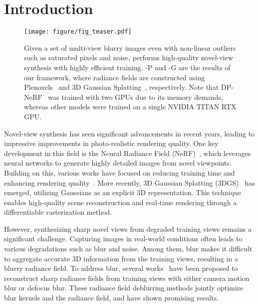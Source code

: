 \section{Introduction}
\label{sec:intro}

\begin{figure*}[t!]
\centering
    \texttt{[image: figure/fig\_teaser.pdf]}
    \caption{Given a set of multi-view blurry images even with non-linear outliers such as saturated pixels and noise, \MethodName{} performs high-quality novel-view synthesis with highly efficient training. \MethodName{}-P and \MethodName{}-G are the results of our framework, where radiance fields are constructed using Plenoxels~\cite{fridovich2022plenoxels} and 3D Gaussian Splatting~\cite{kerbl2023gaussiansplatting}, respectively. Note that DP-NeRF~\cite{lee2023dpnerf} was trained with two GPUs due to its memory demands, whereas other models were trained on a single NVIDIA TITAN RTX GPU.
    }
    \vspace{-3mm}
    \label{fig:teaser}
\end{figure*}

Novel-view synthesis has seen significant advancements in recent years, leading to impressive improvements in photo-realistic rendering quality. One key development in this field is the Neural Radiance Field (NeRF)~\cite{mildenhall2020nerf}, which leverages neural networks to generate highly detailed images from novel viewpoints. Building on this, various works have focused on reducing training time and enhancing rendering quality~\cite{mueller2022instantngp, chen2022tensorf, hu2023trimiprf, fridovich2022plenoxels}. More recently, 3D Gaussian Splatting (3DGS)~\cite{kerbl2023gaussiansplatting} has emerged, utilizing Gaussians as an explicit 3D representation. This technique enables high-quality scene reconstruction and real-time rendering through a differentiable rasterization method.

However, synthesizing sharp novel views from degraded training views remains a significant challenge. Capturing images in real-world conditions often leads to various degradations such as blur and noise.
Among them, blur makes it difficult to aggregate accurate 3D information from the training views, resulting in a blurry radiance field.
To address blur, several works~\cite{ma2022deblurnerf, wang2023badnerf, lee2023dpnerf, peng2023pdrf, lee2023exblurf, lee2024deblurring, peng2024bags} have been proposed to reconstruct sharp radiance fields from training views with either camera motion blur or defocus blur.
These radiance field deblurring methods jointly optimize blur kernels and the radiance field, and have shown promising results.

